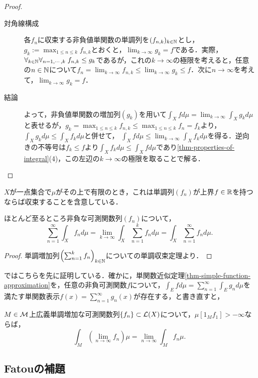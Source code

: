 \documentclass[uplatex, dvipdfmx]{jsreport}
\begin{document}
\begin{proof}
\begin{description}
        \item[対角線構成]
        各$f_n$に収束する非負値単関数の単調列を$(f_{n,k})_{k\in\mathbb{N}}$とし，$g_k:=\max_{1\le n\le k}f_{n,k}$とおくと，$\lim_{k\to\infty}g_k=f$である．実際，$\forall_{k\in\mathbb{N}}\forall_{n=1,\cdots,k}\;f_{n,k}\le g_k$であるが，これの$k\to\infty$の極限を考えると，任意の$n\in\mathbb{N}$について$f_n=\lim_{k\to\infty}f_{n,k}\le\lim_{k\to\infty}g_k\le f$．次に$n\to\infty$を考えて，$\lim_{k\to\infty}g_k=f$．
        \item[結論]
        よって，非負値単関数の増加列$(g_k)$を用いて$\int_Xfd\mu=\lim_{k\to\infty}\int_Xg_kd\mu$と表せるが，$g_k=\max_{1\le n\le k}f_{n,k}\le\max_{1\le n\le k}f_n=f_k$より，$\int_Xg_kd\mu\le\int_Xf_kd\mu$と併せて，
        $\int_Xfd\mu\le\lim_{k\to\infty}\int_Xf_kd\mu$を得る．逆向きの不等号は$f_k\le f$より$\int_Xf_kd\mu\le\int_Xfd\mu$であり\ref{thm-properties-of-integral}(4)，この左辺の$k\to\infty$の極限を取ることで解る．
    \end{description}
\end{proof}
\begin{remark}
    $X$が一点集合で$\mu$がその上で有限のとき，これは単調列$(f_n)$が上界$f\in\mathbb{R}$を持つならば収束することを含意している．
\end{remark}

\begin{corollary}
    ほとんど至るところ非負な可測関数列$(f_n)$について，
    \[\sum^\infty_{n=1}\int_Xf_nd\mu=\lim_{k\to\infty}\int_X\sum^k_{n=1}f_nd\mu=\int_X\sum^\infty_{n=1}f_nd\mu.\]
\end{corollary}
\begin{proof}
    単調増加列$\left(\sum^k_{n=1}f_n\right)_{k\in\mathbb{N}}$についての単調収束定理より．
\end{proof}
\begin{remark}
    \cite{伊藤}ではこちらを先に証明している．確かに，単関数近似定理\ref{thm-simple-function-approximation}を，任意の非負可測関数$f$について，$\int_Efd\mu=\sum^\infty_{n=1}\int_Eg_nd\mu$を満たす単関数表示$f(x)=\sum^\infty_{n=1}g_n(x)$が存在する，と書き直すと，
\end{remark}

\begin{theorem}
    $M\in\mathcal{M}$上広義単調増加な可測関数列$\{f_n\}\subset\mathcal{L}(X)$について，$\mu[1_Mf_1]>-\infty$ならば，
    \[\int_M(\lim_{n\to\infty}f_n)\mu=\lim_{n\to\infty}\int_Mf_n\mu.\]
\end{theorem}

\subsection{Fatouの補題}
\end{document}
